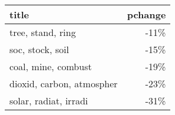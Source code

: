 \begin{tabular}{lr}
\toprule
                     title &  pchange \\
\midrule
         tree, stand, ring &     -11\% \\
          soc, stock, soil &     -15\% \\
       coal, mine, combust &     -19\% \\
 dioxid, carbon, atmospher &     -23\% \\
     solar, radiat, irradi &     -31\% \\
\bottomrule
\end{tabular}

